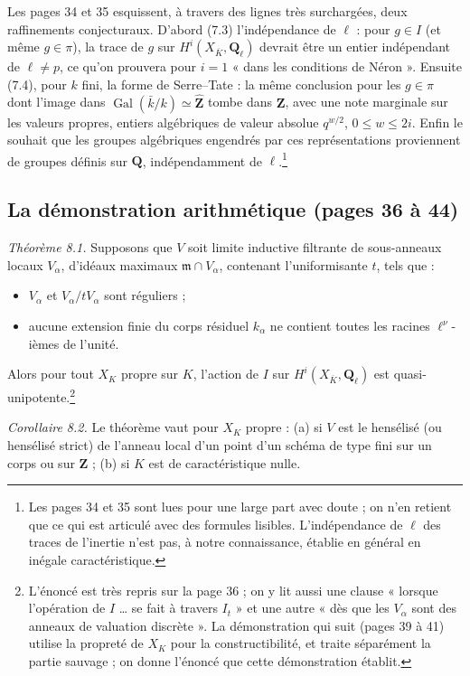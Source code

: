 \documentclass[11pt,a4paper]{article}
\begin{document}
Les pages 34 et 35 esquissent, à travers des lignes très surchargées, deux
raffinements conjecturaux. D'abord (7.3) l'indépendance de $\ell$ : pour $g \in
I$ (et même $g \in \pi$), la trace de $g$ sur $H^i(X_{\overline K},
\mathbf{Q}_\ell)$ devrait être un entier indépendant de $\ell \neq p$, ce
qu'on prouvera pour $i = 1$ « dans les conditions de Néron ». Ensuite (7.4), pour
$k$ fini, la forme de Serre--Tate : la même conclusion pour les $g \in \pi$ dont
l'image dans $\operatorname{Gal}(\bar k/k) \simeq \widehat{\mathbf{Z}}$ tombe
dans $\mathbf{Z}$, avec une note marginale sur les valeurs propres, entiers
algébriques de valeur absolue $q^{w/2}$, $0 \leq w \leq 2i$. Enfin le souhait que
les groupes algébriques engendrés par ces représentations proviennent de groupes
définis sur $\mathbf{Q}$, indépendamment de $\ell$.\footnote{Les pages 34 et 35
sont lues pour une large part avec doute ; on n'en retient que ce qui est
articulé avec des formules lisibles. L'indépendance de $\ell$ des traces de
l'inertie n'est pas, à notre connaissance, établie en général en inégale
caractéristique.}

\subsection*{La démonstration arithmétique (pages 36 à 44)}

\emph{Théorème 8.1.} Supposons que $V$ soit limite inductive filtrante de
sous-anneaux locaux $V_\alpha$, d'idéaux maximaux $\mathfrak{m} \cap V_\alpha$,
contenant l'uniformisante $t$, tels que :
\begin{itemize}
  \item[(a)] $V_\alpha$ et $V_\alpha / tV_\alpha$ sont réguliers ;
  \item[(b)] aucune extension finie du corps résiduel $k_\alpha$ ne contient
    toutes les racines $\ell^\nu$-ièmes de l'unité.
\end{itemize}
Alors pour tout $X_K$ propre sur $K$, l'action de $I$ sur
$H^i(X_{\overline K}, \mathbf{Q}_\ell)$ est quasi-unipotente.\footnote{L'énoncé
est très repris sur la page 36 ; on y lit aussi une clause « lorsque
l'opération de $I$ \ldots{} se fait à travers $I_t$ » et une autre « dès que les
$V_\alpha$ sont des anneaux de valuation discrète ». La démonstration qui suit
(pages 39 à 41) utilise la propreté de $X_K$ pour la constructibilité, et
traite séparément la partie sauvage ; on donne l'énoncé que cette démonstration
établit.}

\emph{Corollaire 8.2.} Le théorème vaut pour $X_K$ propre : (a) si $V$ est le
hensélisé (ou hensélisé strict) de l'anneau local d'un point d'un schéma de
type fini sur un corps ou sur $\mathbf{Z}$ ; (b) si $K$ est de caractéristique
nulle.
\end{document}
